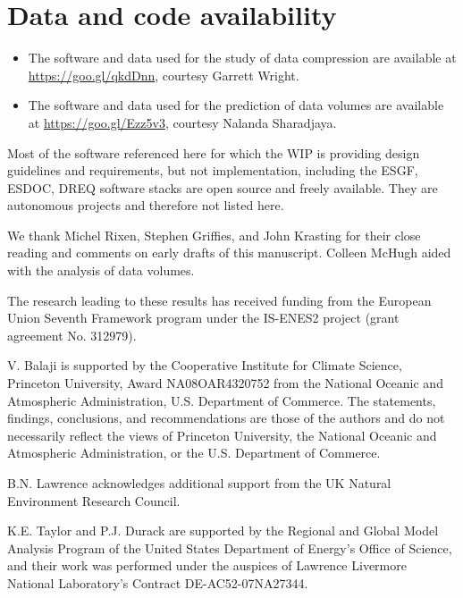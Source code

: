 \documentclass[gmd,manuscript]{copernicus}
\begin{document}
\section{Data and code availability}
\label{sec:code}

\begin{itemize}
\item The software and data used for the study of data compression are
  available at \url{https://goo.gl/qkdDnn}, courtesy Garrett Wright.
\item The software and data used for the prediction of data volumes
  are available at \url{https://goo.gl/Ezz5v3}, courtesy Nalanda
  Sharadjaya.
\end{itemize}

Most of the software referenced here for which the WIP is providing
design guidelines and requirements, but not implementation, including
the ESGF, ESDOC, DREQ software stacks are open source and freely
available. They are autonomous projects and therefore not listed here.

\begin{acknowledgements}
  We thank Michel Rixen, Stephen Griffies, and John Krasting for their
  close reading and comments on early drafts of this manuscript.
  Colleen McHugh aided with the analysis of data volumes.
  
  The research leading to these results has received funding from the
  European Union Seventh Framework program under the IS-ENES2 project
  (grant agreement No. 312979).

  V. Balaji is supported by the Cooperative Institute for Climate
  Science, Princeton University, Award NA08OAR4320752 from the
  National Oceanic and Atmospheric Administration, U.S. Department of
  Commerce. The statements, findings, conclusions, and recommendations
  are those of the authors and do not necessarily reflect the views of
  Princeton University, the National Oceanic and Atmospheric
  Administration, or the U.S. Department of Commerce.

  B.N. Lawrence acknowledges additional support from the UK Natural
  Environment Research Council.
  
  K.E. Taylor and P.J. Durack are supported by the Regional and Global
  Model Analysis Program of the United States Department of Energy's
  Office of Science, and their work was performed under the auspices
  of Lawrence Livermore National Laboratory's Contract
  DE-AC52-07NA27344.
\end{acknowledgements}
\end{document}
